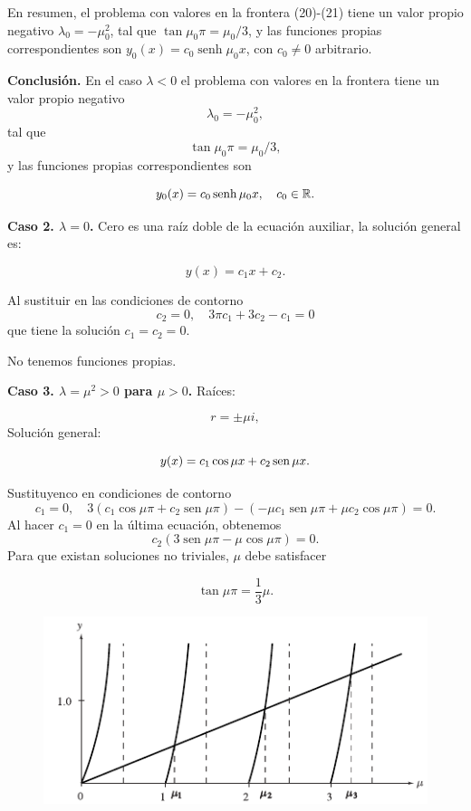 En resumen, el problema con valores en la frontera (20)-(21) tiene un valor propio negativo $\lambda_{0}=-\mu_{0}^{2}$, tal que $\tan \mu_{0} \pi=\mu_{0} / 3$, y las funciones propias correspondientes son $y_{0}(x)=c_{0} \operatorname{senh} \mu_{0} x$, con $c_{0} \neq 0$ arbitrario.


\textbf{Conclusión.} En el caso $\lambda<0$ el problema con valores en la frontera tiene un valor propio negativo 
$$\lambda_{0}=-\mu_{0}^{2},$$
tal que 
$$\tan \mu_{0} \pi=\mu_{0} / 3,$$
y las funciones propias correspondientes son 

$$y_{0}(x)=c_{0} \operatorname{senh} \mu_{0} x,\quad c_{0} \in\mathbb{R}.$$ 

 


\textbf{Caso 2. $\lambda=0$.} Cero es una raíz doble de la ecuación auxiliar, la solución general es:

$$y(x)=c_{1} x+c_{2}.$$ 

Al sustituir en las condiciones de contorno
$$
c_{2}=0, \quad 3 \pi c_{1}+3 c_{2}-c_{1}=0
$$
que tiene la solución $c_{1}=c_{2}=0$. 

No tenemos funciones propias.
 


 
\textbf{Caso 3. $\lambda=\mu^{2}>0$  para $\mu>0$.} Raíces:

$$r=\pm \mu i,$$
Solución general: 

$$y(x)=c_{1} \cos \mu x+c_{2}\operatorname{sen} \mu x .$$

Sustituyenco en condiciones de contorno
$$
c_{1}=0, \quad 3\left(c_{1} \cos \mu \pi+c_{2} \operatorname{sen} \mu \pi\right)-\left(-\mu c_{1} \operatorname{sen} \mu \pi+\mu c_{2} \cos \mu \pi\right)=0 .
$$
$\mathrm{Al}$ hacer $c_{1}=0$ en la última ecuación, obtenemos
$$
c_{2}(3 \operatorname{sen} \mu \pi-\mu \cos \mu \pi)=0 .
$$
Para que existan soluciones no triviales, $\mu$ debe satisfacer 

$$\tan \mu \pi=\frac{1}{3} \mu.$$

 

\begin{figure}[h]
 \begin{center}
  \includegraphics[scale=.6]{imagenes/tanh2.png}
 \end{center}
\end{figure}
 

